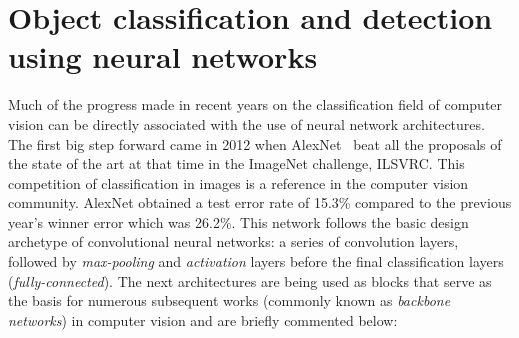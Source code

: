 \section{Object classification and detection using neural networks}
Much of the progress made in recent years on the classification field of computer vision can be directly associated with the use of neural network architectures. The first big step forward came in 2012 when AlexNet~\cite{krizhevsky2012imagenet} beat all the proposals of the state of the art at that time in the ImageNet challenge, ILSVRC. This competition of classification in images is a reference in the computer vision community. AlexNet obtained a test error rate of 15.3\% compared to the previous year's winner error which was 26.2\%. This network follows the basic design archetype of convolutional neural networks: a series of convolution layers, followed by \textit{max-pooling} and \textit{activation} layers before the final classification layers (\textit{fully-connected}). 
The next architectures are being used as blocks that serve as the basis for numerous subsequent works (commonly known as \textit{backbone networks}) in computer vision and are briefly commented below:
